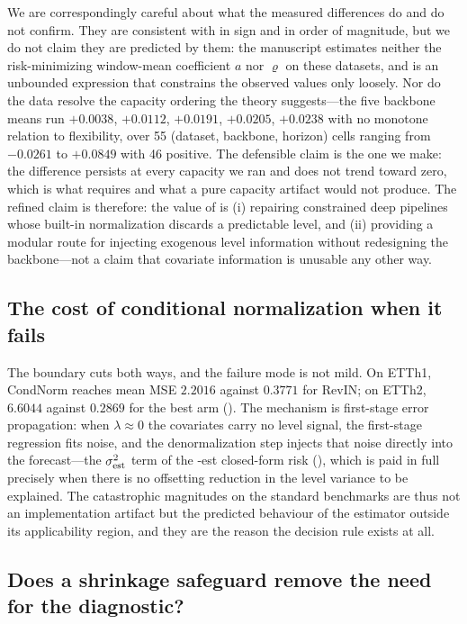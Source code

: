 We are correspondingly careful about what the measured differences do and do not confirm. They are consistent with  in sign and in order of magnitude, but we do not claim they are predicted by them: the manuscript estimates neither the risk-minimizing window-mean coefficient $a$ nor $\varrho$ on these datasets, and  is an unbounded expression that constrains the observed values only loosely. Nor do the data resolve the capacity ordering the theory suggests---the five backbone means run $+0.0038$, $+0.0112$, $+0.0191$, $+0.0205$, $+0.0238$ with no monotone relation to flexibility, over 55 (dataset, backbone, horizon) cells ranging from $-0.0261$ to $+0.0849$ with 46 positive. The defensible claim is the one we make: the difference persists at every capacity we ran and does not trend toward zero, which is what  requires and what a pure capacity artifact would not produce. The refined claim is therefore: the value of \cnm{} is (i) repairing constrained deep pipelines whose built-in normalization discards a predictable level, and (ii) providing a modular route for injecting exogenous level information without redesigning the backbone---not a claim that covariate information is unusable any other way.

\subsection{The cost of conditional normalization when it fails}

The boundary cuts both ways, and the failure mode is not mild. On ETTh1, CondNorm reaches mean MSE $2.2016$ against $0.3771$ for RevIN; on ETTh2, $6.6044$ against $0.2869$ for the best arm (). The mechanism is first-stage error propagation: when $\lambda \approx 0$ the covariates carry no level signal, the first-stage regression fits noise, and the denormalization step injects that noise directly into the forecast---the $\sigma_{\mathrm{est}}^2$ term of the \cnm{}-est closed-form risk (), which is paid in full precisely when there is no offsetting reduction in the level variance to be explained. The catastrophic magnitudes on the standard benchmarks are thus not an implementation artifact but the predicted behaviour of the estimator outside its applicability region, and they are the reason the decision rule exists at all.

\subsection{Does a shrinkage safeguard remove the need for the diagnostic?}\label{sec:shrinkage}

